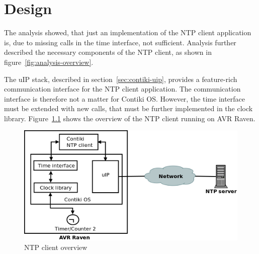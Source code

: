 
\chapter{Design}
The analysis showed, that just an implementation of the
NTP client application is, due to missing calls in the time interface, not sufficient.
Analysis further described the necessary components of the NTP client,
as shown in figure~\ref{fig:analysis-overview}.

The uIP stack, described in section~\ref{sec:contiki-uip}, provides a feature-rich
communication interface for the NTP client application.
The communication interface is therefore not a matter for Contiki OS.
However, the time interface must be extended with new calls,
that must be further implemented in the clock library.
Figure~\ref{fig:design-overview} shows the overview of the NTP client running on AVR Raven.

\begin{figure}[H]
  \centering
  \includegraphics[width=13cm,keepaspectratio]{fig/design.png}
  \caption{NTP client overview} %
  \label{fig:design-overview} %
\end{figure}





%


